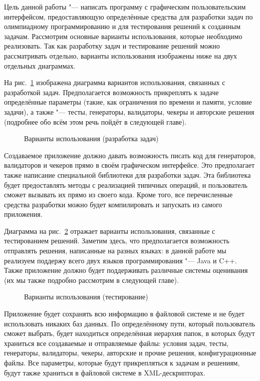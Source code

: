 Цель данной работы "--- написать программу с графическим пользовательским интерфейсом, предоставляющую определённые средства для разработки задач по олимпиадному программированию и для тестирования решений к созданным задачам. Рассмотрим основные варианты использования, которые необходимо реализовать. Так как разработку задач и тестирование решений можно рассматривать отдельно, варианты использования изображены ниже на двух отдельных диаграммах.

На рис.~\ref{use_case_diagram_development} изображена диаграмма вариантов использования, связанных с разработкой задач. Предполагается возможность прикреплять к задаче определённые параметры (такие, как ограничения по времени и памяти, условие задачи), а также "--- тесты, генераторы, валидаторы, чекеры и авторские решения (подробнее обо всём этом речь пойдёт в следующей главе).

\begin{figure}[!b]
\caption{Варианты использования (разработка задач)}
\label{use_case_diagram_development}
\end{figure}

Создаваемое приложение должно давать возможность писать код для генераторов, валидаторов и чекеров прямо в своём графическом интерфейсе. Это предполагает также написание специальной библиотеки для разработки задач. Эта библиотека будет предоставлять методы с реализацией типичных операций, и пользователь сможет вызывать их прямо из своего кода. Кроме того, все перечисленные средства разработки можно будет компилировать и запускать из самого приложения.

Диаграмма на рис.~\ref{use_case_diagram_testing} отражает варианты использования, связанные с тестированием решений. Заметим здесь, что предполагается возможность отправлять решения, написанные на разных языках: в данной работе мы реализуем поддержу всего двух языков программирования "--- Java и C++. Также приложение должно будет поддерживать различные системы оценивания (их мы также подробно рассмотрим в следующей главе).

\begin{figure}[h]
\caption{Варианты использования (тестирование)}
\label{use_case_diagram_testing}
\end{figure}

Приложение будет сохранять всю информацию в файловой системе и не будет использовать никаких баз данных. По определённому пути, который пользователь сможет выбрать, будет находиться определённая иерархия папок, в которых будут храниться все создаваемые и отправляемые файлы: условия задач, тесты, генераторы, валидаторы, чекеры, авторские и прочие решения, конфигурационные файлы. Все параметры, которые будут прикрепляться к задачам и решениям, будут также храниться в файловой системе в XML-дескрипторах.